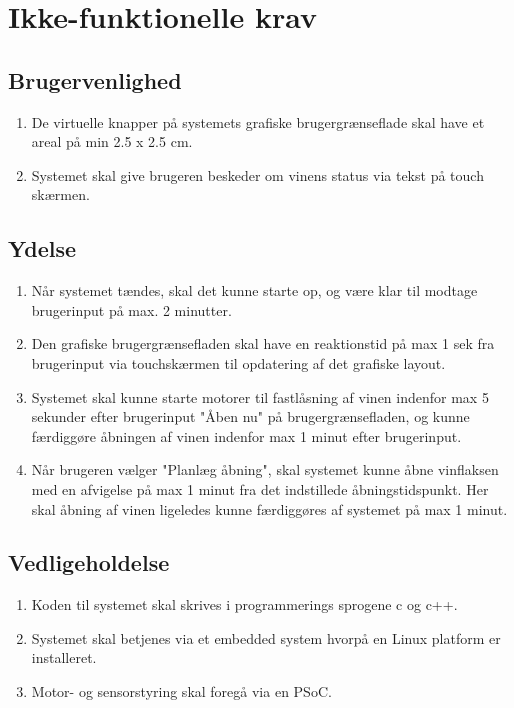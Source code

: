 \section{Ikke-funktionelle krav}

\subsection{Brugervenlighed}

\begin{enumerate}
\item De virtuelle knapper på systemets grafiske brugergrænseflade skal have et areal på min 2.5 x 2.5 cm.
\item Systemet skal give brugeren beskeder om vinens status via tekst på touch skærmen.
\end{enumerate}

\subsection{Ydelse}
\begin{enumerate}
\item Når systemet tændes, skal det kunne starte op, og være klar til modtage brugerinput på max. 2 minutter.
\item Den grafiske brugergrænsefladen skal have en reaktionstid på max 1 sek fra brugerinput via touchskærmen 
til opdatering af det grafiske layout.
\item Systemet skal kunne starte motorer til fastlåsning af vinen indenfor max 5 sekunder efter brugerinput "Åben nu" på brugergrænsefladen, og kunne færdiggøre åbningen af vinen indenfor max 1 minut efter brugerinput.
\item Når brugeren vælger "Planlæg åbning", skal systemet kunne åbne vinflaksen med en afvigelse på max 1 minut fra det indstillede åbningstidspunkt. Her skal åbning af vinen ligeledes kunne færdiggøres af systemet på max 1 minut.
\end{enumerate}

\subsection{Vedligeholdelse}
\begin{enumerate}
\item Koden til systemet skal skrives i programmerings sprogene c og c++.
\item Systemet skal betjenes via et embedded system hvorpå en Linux platform er installeret.
\item Motor- og sensorstyring skal foregå via en PSoC.
\end{enumerate}
